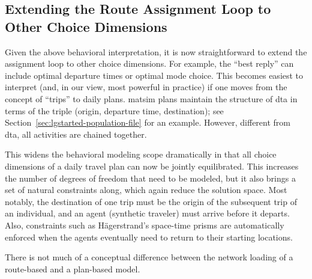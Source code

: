 \subsection{Extending the Route Assignment Loop to Other Choice Dimensions}
\label{sec:extend-route-assignm}

Given the above behavioral interpretation, it is now straightforward
to extend the assignment loop to other choice dimensions.  For
example, the ``best reply'' can include optimal departure times
\citep[e.g.][]{METROPOLIS,EttemaEtcRoutes-timesIatbr03} or optimal mode
choice.  This becomes easiest to interpret (and, in our view, most
powerful in practice) if one moves from the concept of ``trips'' to
daily plans.
\gls{matsim} plans maintain the structure of \gls{dta} in terms of the triple
(origin, departure time, destination); see Section~\ref{sec:lgstarted-population-file}
for an
example. However, different from \gls{dta}, all activities are chained together.

This widens the behavioral modeling scope dramatically in that all
choice dimensions of a daily travel plan can now be jointly
equilibrated. This increases the number of degrees of freedom that
need to be modeled, but it also brings a set of natural constraints
along, which again reduce the solution space. Most notably, the
destination of one trip must be the origin of the subsequent trip of
an individual, and an agent (synthetic traveler) must arrive before it departs.
Also, constraints such as H\"agerstrand's space-time prisms
\citep{Haegerstrand1970WhatAboutPeople} are
automatically enforced when the agents eventually need
to return to their starting locations.

There is not much of a conceptual difference between the network loading of
a route-based and a plan-based model.

